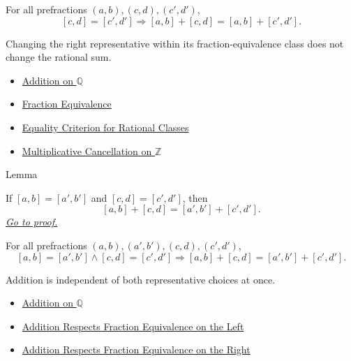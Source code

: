 \begin{remark*}
For all prefractions $(a,b),(c,d),(c',d')$,
\[
[c,d]=[c',d']
\Longrightarrow
[a,b]+[c,d]=[a,b]+[c',d'].
\]
\end{remark*}

\begin{remark*}[Interpretation]
Changing the right representative within its fraction-equivalence class does
not change the rational sum.
\end{remark*}

\begin{dependencies}
\begin{itemize}
  \item \hyperref[def:addition-on-q-classes]{Addition on $\mathbb{Q}$}
  \item \hyperref[def:fraction-equivalence]{Fraction Equivalence}
  \item \hyperref[prop:equality-criterion-for-rational-classes]{Equality Criterion for Rational Classes}
  \item \hyperref[cor:multiplicative-cancellation-on-z]{Multiplicative Cancellation on $\mathbb{Z}$}
\end{itemize}
\end{dependencies}

\begin{lemmabox}{Lemma}
\begin{lemma}
\label{lem:addition-on-q-respects-equivalence}
If $[a,b]=[a',b']$ and $[c,d]=[c',d']$, then
\[
[a,b]+[c,d]=[a',b']+[c',d'].
\]
\hyperref[prf:addition-on-q-respects-equivalence]{\textit{Go to proof.}}
\end{lemma}
\end{lemmabox}

\begin{remark*}
For all prefractions $(a,b),(a',b'),(c,d),(c',d')$,
\[
[a,b]=[a',b']\land [c,d]=[c',d']
\Longrightarrow
[a,b]+[c,d]=[a',b']+[c',d'].
\]
\end{remark*}

\begin{remark*}[Interpretation]
Addition is independent of both representative choices at once.
\end{remark*}

\begin{dependencies}
\begin{itemize}
  \item \hyperref[def:addition-on-q-classes]{Addition on $\mathbb{Q}$}
  \item \hyperref[lem:addition-on-q-respects-left-equivalence]{Addition Respects Fraction Equivalence on the Left}
  \item \hyperref[lem:addition-on-q-respects-right-equivalence]{Addition Respects Fraction Equivalence on the Right}
\end{itemize}
\end{dependencies}

